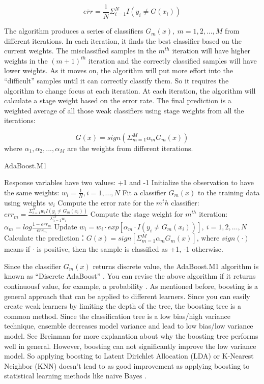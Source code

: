 \documentclass[
  12pt,
]{krantz}
\begin{document}
\[\bar{err}=\frac{1}{N}\Sigma_{i=1}^NI(y_i\neq G(x_i))\]

The algorithm produces a series of classifiers \(G_m(x),\ m=1,2,...,M\) from different iterations. In each iteration, it finds the best classifier based on the current weights. The misclassified samples in the \(m^{th}\) iteration will have higher weights in the \((m+1)^{th}\) iteration and the correctly classified samples will have lower weights. As it moves on, the algorithm will put more effort into the ``difficult'' samples until it can correctly classify them. So it requires the algorithm to change focus at each iteration. At each iteration, the algorithm will calculate a stage weight based on the error rate. The final prediction is a weighted average of all those weak classifiers using stage weights from all the iterations:

\[G(x)=sign ( \Sigma_{m=1}^M \alpha_{m}G_m(x))\]
where \(\alpha_1,\alpha_2,...,\alpha_M\) are the weights from different iterations.

\begin{algorithm}
\caption{AdaBoost.M1}\label{AdaBoostM1algorithm} 
\begin{algorithmic}[1] 
\State Response variables have two values: +1 and -1
\State Initialize the observation to have the same weights:  $w_i=\frac{1}{N},i=1,...,N$
    \State Fit a classifier $G_m(x)$ to the training data using weights $w_i$
    \State Compute the error rate for the $m^th$ classifier: $err_m=\frac{\Sigma_{i=1}^Nw_i I(y_i\neq G_m(x_i))}{\Sigma_{i=1}^Nw_i}$
    \State Compute the stage weight for $m^{th}$ iteration: $\alpha_m=log\frac{1-err_m}{err_m}$
    \State Update $w_i = w_i\cdot exp[\alpha_m\cdot I(y_i \neq G_m(x_i))],\ i=1,2,\dots,N$
\EndFor
\State Calculate the prediction：$G(x)=sign[\Sigma_{m=1}^M\alpha_mG_m(x)]$, where $sign(\cdot)$ means if $\cdot$ is positive, then the sample is classified as +1, -1 otherwise.
\end{algorithmic}
\end{algorithm}

Since the classifier \(G_m(x)\) returns discrete value, the AdaBoost.M1 algorithm is known as ``Discrete AdaBoost'' \citep{Friedman2000}. You can revise the above algorithm if it returns continuousf value, for example, a probability \citep{Friedman2000}. As mentioned before, boosting is a general approach that can be applied to different learners. Since you can easily create weak learners by limiting the depth of the tree, the boosting tree is a common method. Since the classification tree is a low bias/high variance technique, ensemble decreases model variance and lead to low bias/low variance model. See Breinman \citep{Breiman1998} for more explanation about why the boosting tree performs well in general. However, boosting can not significantly improve the low variance model. So applying boosting to Latent Dirichlet Allocation (LDA) or K-Nearest Neighbor (KNN) doesn't lead to as good improvement as applying boosting to statistical learning methods like naive Bayes \citep{Bauer1999}.
\end{document}
